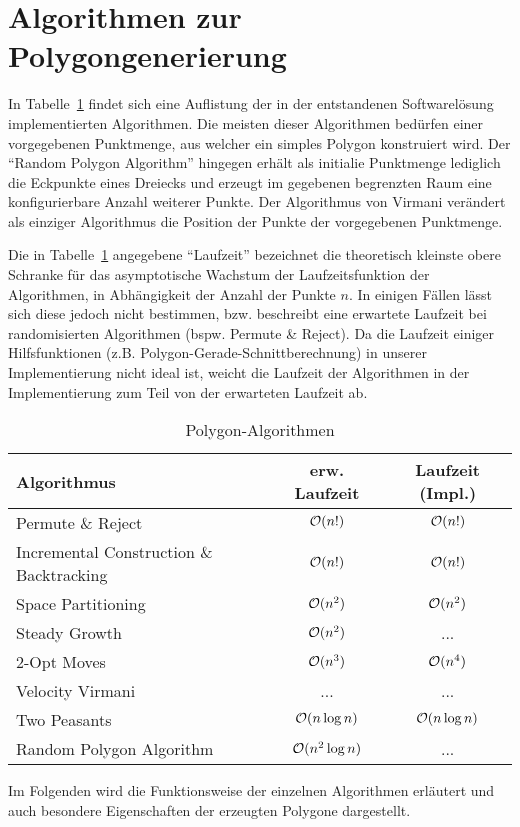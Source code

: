 \section{Algorithmen zur Polygongenerierung}
In Tabelle~\ref{algo_table} findet sich eine Auflistung der in der entstandenen Softwarelösung implementierten Algorithmen. Die meisten dieser Algorithmen bedürfen einer vorgegebenen Punktmenge, aus welcher ein simples Polygon konstruiert wird. Der \enquote{Random Polygon Algorithm} hingegen erhält als initialie Punktmenge lediglich die Eckpunkte eines Dreiecks und erzeugt im gegebenen begrenzten Raum eine konfigurierbare Anzahl weiterer Punkte. Der Algorithmus von Virmani verändert als einziger Algorithmus die Position der Punkte der vorgegebenen Punktmenge. 

Die in Tabelle~\ref{algo_table} angegebene \enquote{Laufzeit} bezeichnet die theoretisch kleinste obere Schranke für das asymptotische Wachstum der Laufzeitsfunktion der Algorithmen, in Abhängigkeit der Anzahl der Punkte $n$. In einigen Fällen lässt sich diese jedoch nicht bestimmen, bzw. beschreibt eine erwartete Laufzeit bei randomisierten Algorithmen (bspw. Permute \& Reject). Da die Laufzeit einiger Hilfsfunktionen (z.B. Polygon-Gerade-Schnittberechnung) in unserer Implementierung nicht ideal ist, weicht die Laufzeit der Algorithmen in der Implementierung zum Teil von der erwarteten Laufzeit ab. 

\begin{table}[ht]
\begin{center}
\caption{Polygon-Algorithmen}
\begin{tabular}{lcc} 
\toprule
Algorithmus & erw. Laufzeit & Laufzeit (Impl.) \\
\midrule
Permute \& Reject & $\mathcal{O}(n!)$ & $\mathcal{O}(n!)$ \\
Incremental Construction \& Backtracking & $\mathcal{O}(n!)$ & $\mathcal{O}(n!)$ \\
Space Partitioning & $\mathcal{O}(n^2)$ & $\mathcal{O}(n^2)$\\
Steady Growth & $\mathcal{O}(n^2)$ & ... \\
2-Opt Moves & $\mathcal{O}(n^3)$ & $\mathcal{O}(n^4)$ \\
Velocity Virmani & ... & ...\\
Two Peasants & $\mathcal{O}(n \log n)$ & $\mathcal{O}(n \log n)$ \\
Random Polygon Algorithm & $\mathcal{O}(n^2 \log n)$ & ... \\
\bottomrule
\end{tabular}
\label{algo_table}
\end{center}
\end{table}

Im Folgenden wird die Funktionsweise der einzelnen Algorithmen erläutert und auch besondere Eigenschaften der erzeugten Polygone dargestellt.